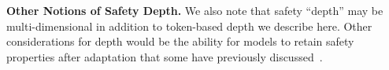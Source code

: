 \textbf{Other Notions of Safety Depth.} We also note that safety ``depth'' may be multi-dimensional in addition to token-based depth we describe here. Other considerations for depth would be the ability for models to retain safety properties after adaptation that some have previously discussed~\citep{henderson2023self,wei2024assessing,qi2023fine}.

